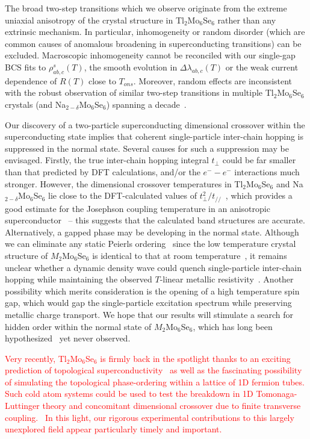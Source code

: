 \documentclass[prb,twocolumn,showpacs,preprintnumbers,amsmath,amssymb,floatfix,groupedaddress,superscriptaddress,aps,10pt]{revtex4-1}
\newcommand{\Tl}{Tl$_2$Mo$_6$Se$_6$}
\newcommand{\Na}{Na$_{2-\delta}$Mo$_6$Se$_6$}
\newcommand{\MMoSe}{$M_2$Mo$_6$Se$_6$}
\begin{document}
{{The broad two-step transitions which we observe originate from the extreme uniaxial anisotropy of the crystal structure in {\Tl} rather than any extrinsic mechanism.  In particular, inhomogeneity or random disorder (which are common causes of anomalous broadening in superconducting transitions) can be excluded.  Macroscopic inhomogeneity cannot be reconciled with our single-gap BCS fits to $\rho^s_{ab,c}(T)$, the smooth evolution in $\Delta\lambda_{ab,c}(T)$ or the weak current dependence of $R(T)$ close to $T_{ons}$.  Moreover, random effects are inconsistent with the robust observation of similar two-step transitions in multiple {\Tl} crystals (and {\Na}) spanning a decade~\cite{Petrovic2007,Petrovic2010,Bergk2011,Ansermet2016}.

Our discovery of a two-particle superconducting dimensional crossover within the superconducting state implies that coherent single-particle inter-chain hopping is suppressed in the normal state.  Several causes for such a suppression may be envisaged.  Firstly, the true inter-chain hopping integral $t_\perp$ could be far smaller than that predicted by DFT calculations, and/or the $e^--e^-$ interactions much stronger. However, the dimensional crossover temperatures in {\Tl} and {\Na} lie close to the DFT-calculated values of $t_\perp^2/t_{/\!/}$~\cite{Ansermet2016}, which provides a good estimate for the Josephson coupling temperature in an anisotropic superconductor~\cite{Little1971,Jerome1980} -- this suggests that the calculated band structures are accurate. Alternatively, a gapped phase may be developing in the normal state.  Although we can eliminate any static Peierls ordering~\cite{Liu2017} since the low temperature crystal structure of {\MMoSe} is identical to that at room temperature~\cite{Petrovic2016}, it remains unclear whether a dynamic density wave could quench single-particle inter-chain hopping while maintaining the observed $T$-linear metallic resistivity~\cite{Petrovic2010}. Another possibility which merits consideration is the opening of a high temperature spin gap, which would gap the single-particle excitation spectrum while preserving metallic charge transport. We hope that our results will stimulate a search for hidden order within the normal state of {\MMoSe}, which has long been hypothesized~\cite{Brusetti1994a} yet never observed.

\textcolor{red}{Very recently, {\Tl} is firmly back in the spotlight thanks to an exciting prediction of topological superconductivity~\cite{q1DTSC} as well as the fascinating possibility of simulating the topological phase-ordering within a lattice of 1D fermion tubes. Such cold atom systems could  be used to test the breakdown in 1D Tomonaga-Luttinger theory and concomitant dimensional crossover due to finite transverse coupling.~\cite{Giamarchi2017} In this light, our rigorous experimental contributions to this largely unexplored field appear particularly timely and important.} 

}}
\end{document}
